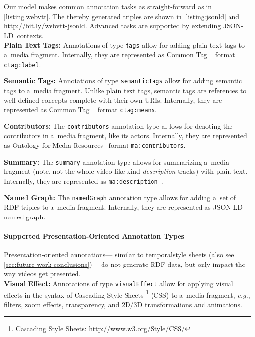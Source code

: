 \documentclass{sig-alternate}
\newcommand{\inlinelistingsize}{\fontsize{8pt}{11pt}}
\let\oldurl\url
\renewcommand{\url}[1]{\inlinelistingsize\oldurl{#1}}
\def\JSONLD{\mbox{JSON-LD}}
\begin{document}
Our model makes common annotation tasks as
straight-forward as in \autoref{listing:webvtt}.
The thereby generated triples are shown in
\autoref{listing:jsonld} and \url{http://bit.ly/webvtt-jsonld}.
Advanced tasks are supported by extending \JSONLD~contexts.\\

\noindent \textbf{Plain Text Tags:} Annotations of type
  \texttt{tags} allow for add\-ing plain text tags
  to a~media fragment.
  Internally, they are represented as Common Tag%
  ~\cite{commontag2009spec} format \texttt{ctag:label}.

\noindent \textbf{Semantic Tags:} Annotations of type
  \texttt{semanticTags} allow for adding semantic tags
  to a~media fragment.
  Unlike plain text tags, semantic tags are references to
  well-defined concepts complete with their own URIs.
  Internally, they are represented as Common Tag%
  ~\cite{commontag2009spec} format \texttt{ctag:means}.

\noindent \textbf{Contributors:} The \texttt{contributors} annotation type
  al-\linebreak lows for denoting the contributors in a~media fragment, like its actors.
  Internally, they are represented as
  Ontology for Media Resources~\cite{lee2012mediaontology}
  format \texttt{ma:contributors}.

\noindent \textbf{Summary:} The \texttt{summary} annotation type
  allows for summarizing a~media fragment
  (note, not the whole video like kind \emph{description} tracks)
  with plain text.
  Internally, they are represented as  
  \texttt{ma:description}~\cite{lee2012mediaontology}.

\noindent \textbf{Named Graph:} The \texttt{namedGraph} annotation type
  allows for adding a~set of RDF triples
  to a~media fragment.
  Internally, they are represented as \JSONLD%
  ~\cite{sporny2013jsonld} named graph.

\paragraph{Supported Presentation-Oriented Annotation Types}

Presentation-oriented annotations---%
similar to temporal\linebreak style sheets
(also see \autoref{sec:future-work-conclusions})---%
do not generate RDF data,
but only impact the way videos get presented.\\

\noindent \textbf{Visual Effect:} Annotations of
  type \texttt{visualEffect} allow for applying visual effects
  in the syntax of Cascading Style Sheets%
  \footnote{Cascading Style Sheets:
  \url{http://www.w3.org/Style/CSS/}} (CSS)
  to a~media fragment, \emph{e.g.},
  filters, zoom effects, transparency,
  and 2D/3D transformations and animations.
\end{document}
